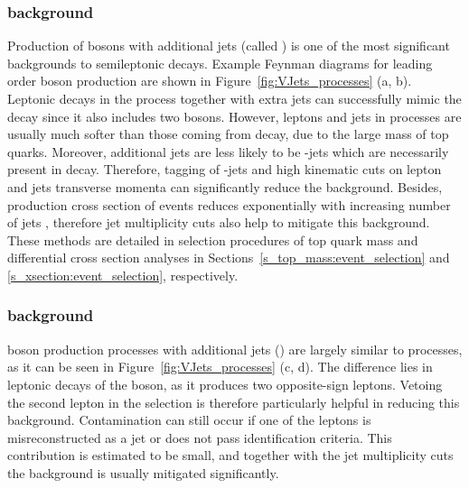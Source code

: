 \subsubsection*{\WpJets background}
Production of \W bosons with additional jets (called \WpJets) is one of the most significant backgrounds to semileptonic
\ttbar decays. Example Feynman diagrams for leading order \W boson production are shown in
Figure~\ref{fig:VJets_processes} (a, b). Leptonic decays in the \WpJets process together with extra jets can
successfully mimic the \ttbar decay since it also includes two \W bosons. However, leptons and jets in \WpJets processes
are usually much softer than those coming from \ttbar decay, due to the large mass of top quarks. Moreover, additional
jets are less likely to be \cPqb-jets which are necessarily present in \ttbar decay. Therefore, tagging of \cPqb-jets
and high kinematic cuts on lepton and jets transverse momenta can significantly reduce the
\WpJets background. Besides, production cross section of \WpJets events reduces exponentially with increasing number of
jets \autocite{multijet_WZ}, therefore jet multiplicity cuts also help to mitigate this background. These methods are
detailed in selection procedures of top quark mass and differential cross section analyses in
Sections~\ref{s_top_mass:event_selection} and \ref{s_xsection:event_selection}, respectively.

\subsubsection*{\ZpJets background}
\Z boson production processes with additional jets (\ZpJets) are largely similar to \WpJets processes, as it can be seen
in Figure~\ref{fig:VJets_processes} (c, d). The difference lies in leptonic decays of the \Z boson, as it produces two
opposite-sign leptons. Vetoing the second lepton in the selection is therefore particularly helpful in reducing this
background. Contamination can still occur if one of the leptons is misreconstructed as a jet or does not pass
identification criteria. This contribution is estimated to be small, and together with the jet multiplicity cuts the
\ZpJets background is usually mitigated significantly.



